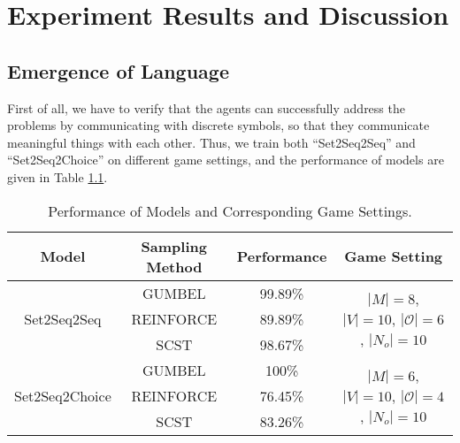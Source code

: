 \chapter{Experiment Results and Discussion}
\label{ch4:results_analysis}


\section{Emergence of Language}
\label{sec4.1:emergence}

First of all, we have to verify that the agents can successfully address the problems by communicating with discrete symbols, so that they communicate meaningful things with each other. Thus, we train both ``Set2Seq2Seq'' and ``Set2Seq2Choice'' on different game settings, and the performance of models are given in Table \ref{tab4.1:game_performance}.

\begin{table}[!h]
    \centering
    \begin{tabular}{|c|c|c|c|}
        \hline
        Model                           & Sampling Method & Performance & Game Setting      \\ \hline
        \multirow{3}{*}{Set2Seq2Seq}    & GUMBEL          & 99.89\%     & \multirow{3}{1.5in}{$|M|=8$, $|V|=10$, $|\mathcal{O}|=6$, $|N_{o}|=10$} \\ \cline{2-3}
                                        & REINFORCE       & 89.89\%     &                   \\ \cline{2-3}
                                        & SCST            & 98.67\%     &                   \\ \hline
        \multirow{3}{*}{Set2Seq2Choice} & GUMBEL          & 100\%       & \multirow{3}{1.5in}{$|M|=6$, $|V|=10$, $|\mathcal{O}|=4$, $|N_{o}|=10$} \\ \cline{2-3}
                                        & REINFORCE       & 76.45\%     &                   \\ \cline{2-3}
                                        & SCST            & 83.26\%     &                   \\ \hline
        \end{tabular}
    \caption{Performance of Models and Corresponding Game Settings.}
    \label{tab4.1:game_performance}
\end{table}

